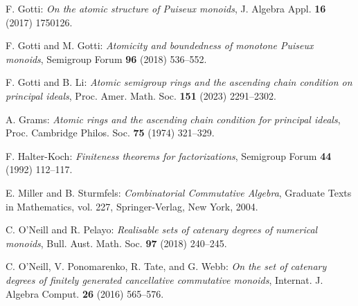 \documentclass[12pt]{amsart}
\theoremstyle{definition}
\numberwithin{equation}{section}
\begin{document}
\begin{thebibliography}{20}
	 F. Gotti: \emph{On the atomic structure of Puiseux monoids}, J. Algebra Appl. \textbf{16} (2017) 1750126.
	
	 F. Gotti and M. Gotti: \emph{Atomicity and boundedness of monotone Puiseux monoids}, Semigroup Forum \textbf{96} (2018) 536--552.
		
	 F. Gotti and B. Li: \emph{Atomic semigroup rings and the ascending chain condition on principal ideals}, Proc. Amer. Math. Soc. \textbf{151} (2023) 2291--2302.


	 A. Grams: \emph{Atomic rings and the ascending chain condition for principal ideals}, Proc. Cambridge Philos. Soc. \textbf{75} (1974) 321--329.

	 F. Halter-Koch: \emph{Finiteness theorems for factorizations}, Semigroup Forum \textbf{44} (1992) 112--117.

	 E. Miller and B. Sturmfels: \emph{Combinatorial Commutative Algebra}, Graduate Texts in Mathematics, vol. 227, Springer-Verlag, New York, 2004.
	
	 C. O'Neill and R. Pelayo: \emph{Realisable sets of catenary degrees of numerical monoids}, Bull. Aust. Math. Soc. \textbf{97} (2018) 240--245.

	 C. O’Neill, V. Ponomarenko, R. Tate, and G. Webb: \emph{On the set of catenary degrees of finitely generated cancellative commutative monoids}, Internat. J. Algebra Comput. \textbf{26} (2016) 565--576.

\end{thebibliography}
\end{document}
